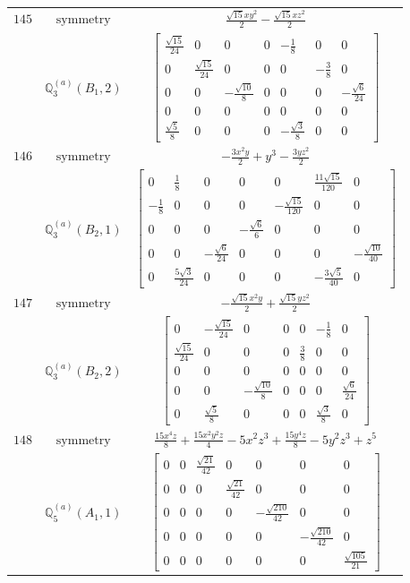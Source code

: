 \documentclass[fleqn,8pt,landscape]{jsarticle}
\begin{document}
\begin{longtable}{ccc}
$ 145 $ & $ \text{symmetry} $ & $ \frac{\sqrt{15} x y^{2}}{2} - \frac{\sqrt{15} x z^{2}}{2} $ \\
$  $ & $ \mathbb{Q}_{3}^{(a)}(B_{1},2) $ & $ \begin{bmatrix} \frac{\sqrt{15}}{24} & 0 & 0 & 0 & - \frac{1}{8} & 0 & 0 \\ 0 & \frac{\sqrt{15}}{24} & 0 & 0 & 0 & - \frac{3}{8} & 0 \\ 0 & 0 & - \frac{\sqrt{10}}{8} & 0 & 0 & 0 & - \frac{\sqrt{6}}{24} \\ 0 & 0 & 0 & 0 & 0 & 0 & 0 \\ \frac{\sqrt{5}}{8} & 0 & 0 & 0 & - \frac{\sqrt{3}}{8} & 0 & 0 \end{bmatrix} $ \\ \hline
$ 146 $ & $ \text{symmetry} $ & $ - \frac{3 x^{2} y}{2} + y^{3} - \frac{3 y z^{2}}{2} $ \\
$  $ & $ \mathbb{Q}_{3}^{(a)}(B_{2},1) $ & $ \begin{bmatrix} 0 & \frac{1}{8} & 0 & 0 & 0 & \frac{11 \sqrt{15}}{120} & 0 \\ - \frac{1}{8} & 0 & 0 & 0 & - \frac{\sqrt{15}}{120} & 0 & 0 \\ 0 & 0 & 0 & - \frac{\sqrt{6}}{6} & 0 & 0 & 0 \\ 0 & 0 & - \frac{\sqrt{6}}{24} & 0 & 0 & 0 & - \frac{\sqrt{10}}{40} \\ 0 & \frac{5 \sqrt{3}}{24} & 0 & 0 & 0 & - \frac{3 \sqrt{5}}{40} & 0 \end{bmatrix} $ \\ \hline
$ 147 $ & $ \text{symmetry} $ & $ - \frac{\sqrt{15} x^{2} y}{2} + \frac{\sqrt{15} y z^{2}}{2} $ \\
$  $ & $ \mathbb{Q}_{3}^{(a)}(B_{2},2) $ & $ \begin{bmatrix} 0 & - \frac{\sqrt{15}}{24} & 0 & 0 & 0 & - \frac{1}{8} & 0 \\ \frac{\sqrt{15}}{24} & 0 & 0 & 0 & \frac{3}{8} & 0 & 0 \\ 0 & 0 & 0 & 0 & 0 & 0 & 0 \\ 0 & 0 & - \frac{\sqrt{10}}{8} & 0 & 0 & 0 & \frac{\sqrt{6}}{24} \\ 0 & \frac{\sqrt{5}}{8} & 0 & 0 & 0 & \frac{\sqrt{3}}{8} & 0 \end{bmatrix} $ \\ \hline
$ 148 $ & $ \text{symmetry} $ & $ \frac{15 x^{4} z}{8} + \frac{15 x^{2} y^{2} z}{4} - 5 x^{2} z^{3} + \frac{15 y^{4} z}{8} - 5 y^{2} z^{3} + z^{5} $ \\
$  $ & $ \mathbb{Q}_{5}^{(a)}(A_{1},1) $ & $ \begin{bmatrix} 0 & 0 & \frac{\sqrt{21}}{42} & 0 & 0 & 0 & 0 \\ 0 & 0 & 0 & \frac{\sqrt{21}}{42} & 0 & 0 & 0 \\ 0 & 0 & 0 & 0 & - \frac{\sqrt{210}}{42} & 0 & 0 \\ 0 & 0 & 0 & 0 & 0 & - \frac{\sqrt{210}}{42} & 0 \\ 0 & 0 & 0 & 0 & 0 & 0 & \frac{\sqrt{105}}{21} \end{bmatrix} $ \\ \hline

\end{longtable}
\end{document}
